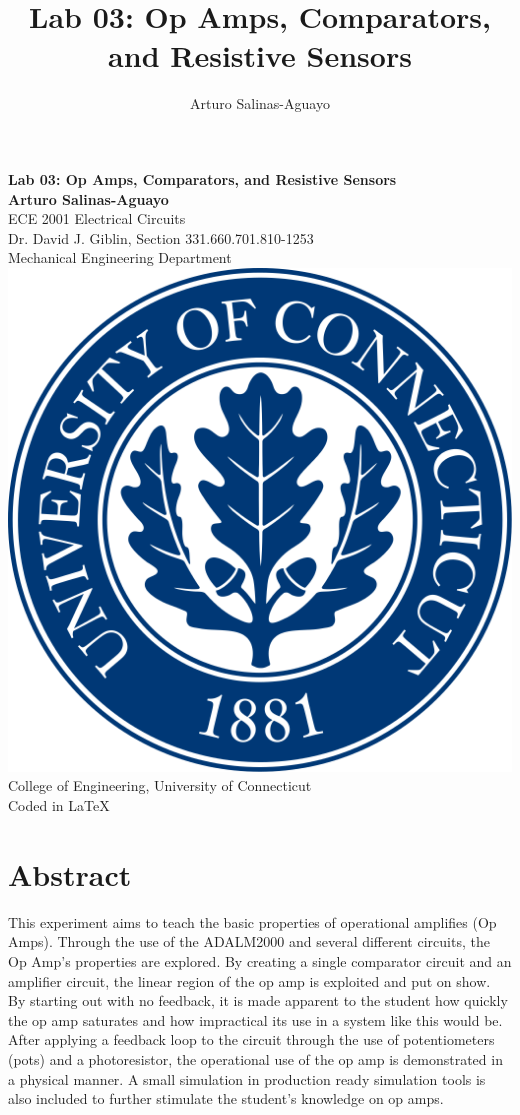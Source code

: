 \documentclass[12pt]{article}
\author{Arturo Salinas-Aguayo}
\title{Lab 03: Op Amps, Comparators, and Resistive Sensors}
\begin{document}
\newcommand{\closure}[2][3]{%
	{}\mkern#1mu\overline{\mkern-#1mu#2}}
\newcommand\ncoverline[1]{\mkern1mu\overline{\mkern-1mu#1\mkern-1mu}\mkern1mu}
\begin{titlepage}
	\centering
	\vspace*{3cm}
	\huge\textbf{Lab 03: Op Amps, Comparators, and Resistive Sensors}\\
	\vspace{5cm}
	\Large\textbf{Arturo Salinas-Aguayo}\\
	\normalsize
	ECE 2001 Electrical Circuits\\
	Dr. David J. Giblin, Section 331.660.701.810-1253\\
	Mechanical Engineering Department
	\vfill
	\includegraphics[scale=0.1]{uconnlogo}\\
	College of Engineering, University of Connecticut\\
	\scriptsize{Coded in \LaTeX}
	\vspace*{1cm}
\end{titlepage}
\tableofcontents
\newpage
\section{Abstract}
This experiment aims to teach the basic properties of operational amplifies (Op
Amps). Through the use of the ADALM2000 and several different circuits, the Op
Amp's properties are explored. By creating a single comparator circuit and an
amplifier circuit, the linear region of the op amp is exploited and put on show.
By starting out with no feedback, it is made apparent to the student how quickly
the op amp saturates and how impractical its use in a system like this would be.
After applying a feedback loop to the circuit through the use of potentiometers
(pots) and a photoresistor, the operational use of the op amp is demonstrated in
a physical manner. A small simulation in production ready simulation tools is
also included to further stimulate the student's knowledge on op amps.
\newpage
\end{document}

